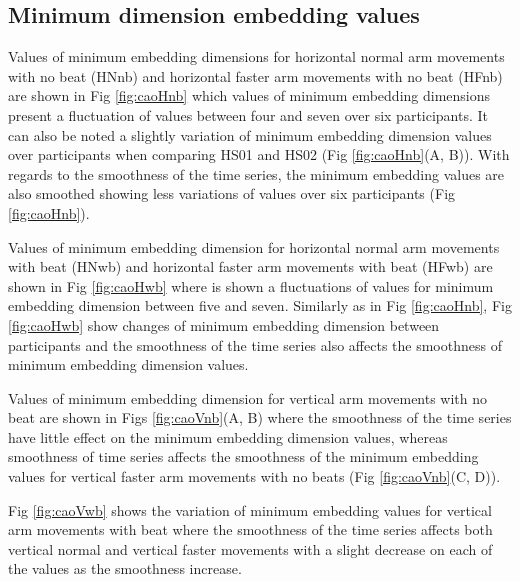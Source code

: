\subsection{Minimum dimension embedding values}
Values of minimum embedding dimensions for horizontal normal arm movements 
with no beat (HNnb) and horizontal faster arm movements 
with no beat (HFnb) are shown in Fig \ref{fig:caoHnb} which values of 
minimum embedding dimensions present a fluctuation of values between four 
and seven over six participants.
It can also be noted a slightly variation of minimum embedding dimension values 
over participants when comparing HS01 and HS02 (Fig \ref{fig:caoHnb}(A, B)).
With regards to the smoothness of the time series,
the minimum embedding values are also smoothed showing less variations of
values over six participants (Fig \ref{fig:caoHnb}).

Values of minimum embedding dimension for horizontal normal arm movements 
with beat (HNwb) and horizontal faster arm movements with beat (HFwb) 
are shown in Fig \ref{fig:caoHwb} where is shown a fluctuations of values
for minimum embedding dimension between five and seven.
Similarly as in Fig \ref{fig:caoHnb}, Fig \ref{fig:caoHwb} show changes of 
minimum embedding dimension between participants and the smoothness of the 
time series also affects the smoothness of minimum embedding dimension values.


Values of minimum embedding dimension for vertical arm movements with no beat
are shown in Figs \ref{fig:caoVnb}(A, B) where the smoothness 
of the time series have little effect on the minimum embedding dimension 
values, whereas smoothness of time series affects the smoothness of the 
minimum embedding values for vertical faster arm movements with no beats 
(Fig \ref{fig:caoVnb}(C, D)).

Fig \ref{fig:caoVwb} shows the variation of minimum embedding values for 
vertical arm movements with beat where the smoothness of the time series
affects both vertical normal and vertical faster movements with a slight 
decrease on each of the values as the smoothness increase.




